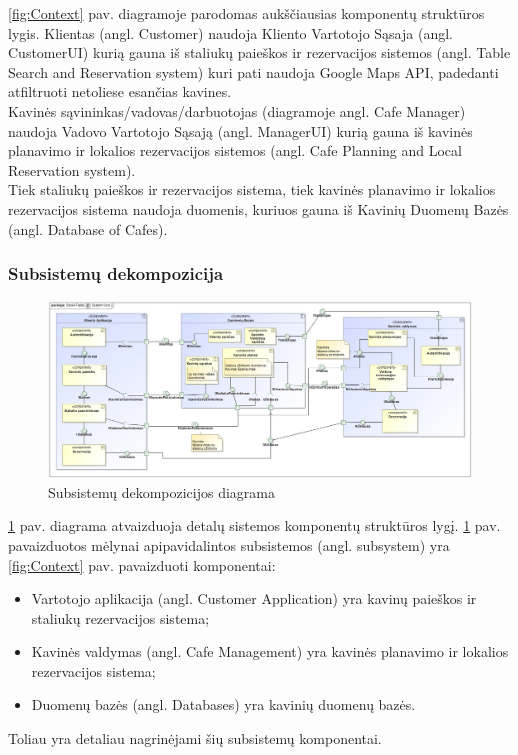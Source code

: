\documentclass{VUMIFPSkursinis}
\begin{document}
\ref {fig:Context} pav. diagramoje parodomas aukščiausias komponentų struktūros lygis. Klientas (angl. Customer) naudoja Kliento Vartotojo Sąsaja (angl. CustomerUI) kurią gauna iš staliukų paieškos ir rezervacijos sistemos (angl. Table Search and Reservation system) kuri pati naudoja Google Maps API, padedanti atfiltruoti netoliese esančias kavines. \\
Kavinės sąvininkas/vadovas/darbuotojas (diagramoje angl. Cafe Manager) naudoja Vadovo Vartotojo Sąsają (angl. ManagerUI) kurią gauna iš kavinės planavimo ir lokalios rezervacijos sistemos (angl. Cafe Planning and Local Reservation system).\\
Tiek staliukų paieškos ir rezervacijos sistema, tiek kavinės planavimo ir lokalios rezervacijos sistema naudoja duomenis, kuriuos gauna iš Kavinių Duomenų Bazės (angl. Database of Cafes).


\begin{landscape}
\subsubsection{Subsistemų dekompozicija}
	\begin {figure}[H]
		\includegraphics[width=1.67\textwidth,height=1.67\textheight,keepaspectratio]{img/SystemCore}
		\caption{Subsistemų dekompozicijos diagrama}
		\label{fig:System Core}
	\end{figure}
\end{landscape}

\ref {fig:System Core} pav. diagrama atvaizduoja detalų sistemos komponentų struktūros lygį. \ref {fig:System Core} pav. pavaizduotos mėlynai apipavidalintos subsistemos (angl. subsystem) yra \ref {fig:Context} pav. pavaizduoti komponentai:
\begin{itemize}
  \item Vartotojo aplikacija (angl. Customer Application) yra kavinų paieškos ir staliukų rezervacijos sistema;
  \item Kavinės valdymas (angl. Cafe Management) yra kavinės planavimo ir lokalios rezervacijos sistema;
  \item Duomenų bazės (angl. Databases) yra kavinių duomenų bazės.
\end{itemize}
Toliau yra detaliau nagrinėjami šių subsistemų komponentai.\\
\end{document}
